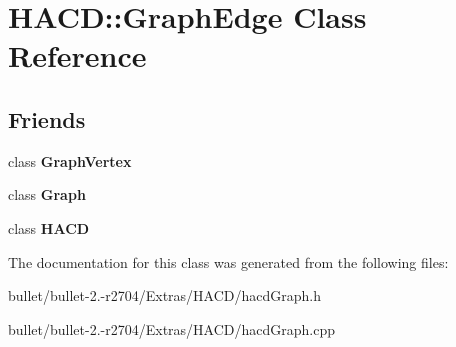 \hypertarget{class_h_a_c_d_1_1_graph_edge}{\section{H\+A\+C\+D\+:\+:Graph\+Edge Class Reference}
\label{class_h_a_c_d_1_1_graph_edge}
}
\subsection*{Friends}
\begin{DoxyCompactItemize}
\item 
\hypertarget{class_h_a_c_d_1_1_graph_edge_a8f525f61c613bd8083d8a87e97b620f2}{class {\bfseries Graph\+Vertex}}\label{class_h_a_c_d_1_1_graph_edge_a8f525f61c613bd8083d8a87e97b620f2}

\item 
\hypertarget{class_h_a_c_d_1_1_graph_edge_afab89afd724f1b07b1aaad6bdc61c47a}{class {\bfseries Graph}}\label{class_h_a_c_d_1_1_graph_edge_afab89afd724f1b07b1aaad6bdc61c47a}

\item 
\hypertarget{class_h_a_c_d_1_1_graph_edge_ab3497bc7797561d0c79ecef2f462e43a}{class {\bfseries H\+A\+C\+D}}\label{class_h_a_c_d_1_1_graph_edge_ab3497bc7797561d0c79ecef2f462e43a}

\end{DoxyCompactItemize}


The documentation for this class was generated from the following files\+:\begin{DoxyCompactItemize}
\item 
bullet/bullet-\/2.-\/r2704/\+Extras/\+H\+A\+C\+D/hacd\+Graph.\+h\item 
bullet/bullet-\/2.-\/r2704/\+Extras/\+H\+A\+C\+D/hacd\+Graph.\+cpp\end{DoxyCompactItemize}
